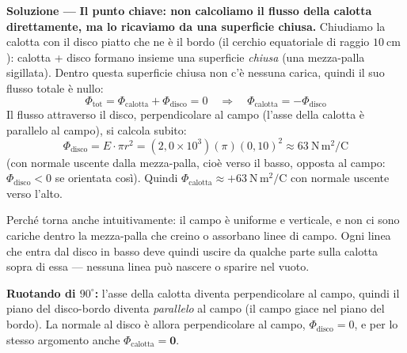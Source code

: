 \documentclass[11pt,a4paper]{scrartcl}
\renewcommand{\deg}{^\circ}
\newenvironment{soluzione}{\par\noindent\textbf{Soluzione ---} }{\par}
\begin{document}
\begin{center}
\end{center}

\begin{soluzione}
\textbf{Il punto chiave: non calcoliamo il flusso della calotta direttamente, ma lo ricaviamo da
una superficie chiusa.} Chiudiamo la calotta con il disco piatto che ne è il bordo (il cerchio
equatoriale di raggio $10\ \text{cm}$): calotta + disco formano insieme una superficie
\emph{chiusa} (una mezza-palla sigillata). Dentro questa superficie chiusa non c'è nessuna carica,
quindi il suo flusso totale è nullo:
\begin{equation}
  \Phi_{\text{tot}} = \Phi_{\text{calotta}} + \Phi_{\text{disco}} = 0
  \quad\Longrightarrow\quad
  \Phi_{\text{calotta}} = -\Phi_{\text{disco}}
\end{equation}
Il flusso attraverso il disco, perpendicolare al campo (l'asse della calotta è parallelo al
campo), si calcola subito:
\begin{equation}
  \Phi_{\text{disco}} = E\cdot\pi r^2 = (2{,}0\times10^3)(\pi)(0{,}10)^2 \approx 63\ \text{N}\,\text{m}^2/\text{C}
\end{equation}
(con normale uscente dalla mezza-palla, cioè verso il basso, opposta al campo: $\Phi_{\text{disco}}<0$
se orientata così). Quindi $\Phi_{\text{calotta}} \approx +63\ \text{N}\,\text{m}^2/\text{C}$ con
normale uscente verso l'alto.

Perché torna anche intuitivamente: il campo è uniforme e verticale, e non ci sono cariche dentro la
mezza-palla che creino o assorbano linee di campo. Ogni linea che entra dal disco in basso deve
quindi uscire da qualche parte sulla calotta sopra di essa --- nessuna linea può nascere o sparire
nel vuoto.

\textbf{Ruotando di $90\deg$:} l'asse della calotta diventa perpendicolare al campo, quindi il
piano del disco-bordo diventa \emph{parallelo} al campo (il campo giace nel piano del bordo). La
normale al disco è allora perpendicolare al campo, $\Phi_{\text{disco}}=0$, e per lo stesso
argomento anche $\Phi_{\text{calotta}} = \mathbf{0}$.
\end{soluzione}
\end{document}
